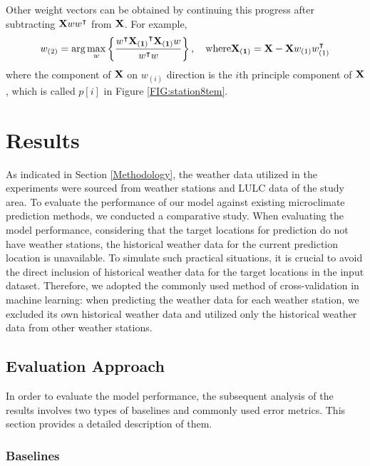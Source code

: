 \documentclass[a4paper,fleqn]{cas-sc}
\begin{document}
Other weight vectors can be obtained by continuing this progress after subtracting $\bold{X}ww^\intercal$ from $\bold{X}$. For example,
\begin{equation}
    w_{(2)}=\text{arg}\max_{w}\left\{ \frac{w^\intercal\bold{X_{(1)}}^\intercal\bold{X_{(1)}} w}{w^\intercal w}\right\},\quad \text{where} \bold{X_{(1)}}=\bold{X}-\bold{X}w_{(1)}w_{(1)}^\intercal
\end{equation}
where the component of $\bold{X}$ on $w_{(i)}$ direction is the $i$th principle component of $\bold{X}$, which is called $p[i]$ in Figure \ref{FIG:station8tem}.

\section{Results}\label{Results}

As indicated in Section \ref{Methodology}, the weather data utilized in the experiments were sourced from weather stations and LULC data of the study area. To evaluate the performance of our model against existing microclimate prediction methods, we conducted a comparative study. When evaluating the model performance, considering that the target locations for prediction do not have weather stations, the historical weather data for the current prediction location is unavailable. To simulate such practical situations, it is crucial to avoid the direct inclusion of historical weather data for the target locations in the input dataset. Therefore, we adopted the commonly used method of cross-validation in machine learning: when predicting the weather data for each weather station, we excluded its own historical weather data and utilized only the historical weather data from other weather stations.

\subsection{Evaluation Approach}\label{evaluation method}

In order to evaluate the model performance, the subsequent analysis of the results involves two types of baselines and commonly used error metrics. This section provides a detailed description of them.

\subsubsection{Baselines}\label{baselines}
\end{document}
